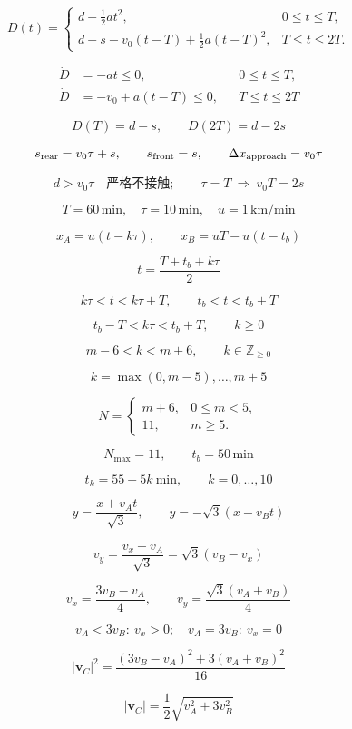 \documentclass[12pt]{article}
\begin{document}
\[
D(t)=\begin{cases}d-\frac12at^2,&0\le t\le T,\\d-s-v_0(t-T)+\frac12a(t-T)^2,&T\le t\le2T.\end{cases}
\]

\[
\begin{aligned} \dot D&=-at\le0,&&0\le t\le T,\\ \dot D&=-v_0+a(t-T)\le0,&&T\le t\le2T \end{aligned}
\]

\[
D(T)=d-s,\qquad D(2T)=d-2s
\]

\[
s_{\rm rear}=v_0\tau+s,\qquad s_{\rm front}=s,\qquad\Delta x_{\rm approach}=v_0\tau
\]

\[
\boxed{d>v_0\tau}\quad\text{严格不接触};\qquad\tau=T\ \Longrightarrow\ v_0T=2s
\]

\[
T=60\,\mathrm{min},\quad\tau=10\,\mathrm{min},\quad u=1\,\mathrm{km/min}
\]

\[
x_A=u(t-k\tau),\qquad x_B=uT-u(t-t_b)
\]

\[
t=\frac{T+t_b+k\tau}{2}
\]

\[
k\tau<t<k\tau+T,\qquad t_b<t<t_b+T
\]

\[
\boxed{t_b-T<k\tau<t_b+T},\qquad k\ge0
\]

\[
m-6<k<m+6,\qquad k\in\mathbb Z_{\ge0}
\]

\[
k=\max(0,m-5),\ldots,m+5
\]

\[
N=\begin{cases}m+6,&0\le m<5,\\11,&m\ge5.\end{cases}
\]

\[
\boxed{N_{\max}=11},\qquad \boxed{t_b=50\,\mathrm{min}}
\]

\[
t_k=55+5k\ \mathrm{min},\qquad k=0,\ldots,10
\]

\[
y=\frac{x+v_At}{\sqrt3},\qquad y=-\sqrt3(x-v_Bt)
\]

\[
v_y=\frac{v_x+v_A}{\sqrt3}=\sqrt3(v_B-v_x)
\]

\[
\boxed{v_x=\frac{3v_B-v_A}{4}},\qquad\boxed{v_y=\frac{\sqrt3(v_A+v_B)}4}
\]

\[
v_A<3v_B:\ v_x>0;\quad v_A=3v_B:\ v_x=0
\]

\[
|\boldsymbol v_C|^2 =\frac{(3v_B-v_A)^2+3(v_A+v_B)^2}{16}
\]

\[
\boxed{|\boldsymbol v_C|=\frac12\sqrt{v_A^2+3v_B^2}}
\]
\end{document}
